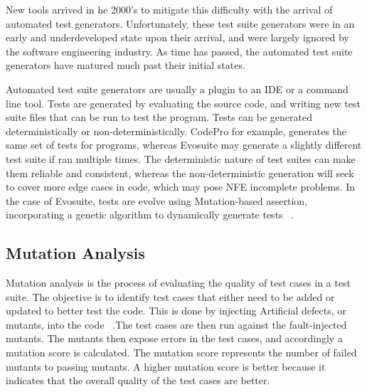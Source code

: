 \documentclass[conference]{IEEEtran}
\begin{document}
New tools arrived in he 2000's to mitigate this difficulty with the arrival of automated test generators. Unfortunately, these test suite generators were in an early and underdeveloped state upon their arrival, and were largely ignored by the software engineering industry. As time has passed, the automated test suite generators have matured much past their initial states.

Automated test suite generators are usually a plugin to an IDE or a command line tool. Tests are generated by evaluating the source code, and writing new test suite files that can be run to test the program.  Tests can be generated deterministically or non-deterministically. CodePro for example, generates the same set of tests for programs, whereas Evosuite may generate a slightly different test suite if ran multiple times. The deterministic nature of test suites can make them reliable and consistent, whereas the non-deterministic generation will seek to cover more edge cases in code, which may pose NFE incomplete problems. In the case of Evosuite, tests are evolve using Mutation-based assertion, incorporating a genetic algorithm to dynamically generate tests ~\cite{Fraser:2011:EAT:2025113.2025179}. 

\subsection{Mutation Analysis}
Mutation analysis is the process of evaluating the quality of test cases in a test suite. The objective is to identify test cases that either need to be added or updated to better test the code. This is done by injecting Artificial defects, or mutants, into the code ~\cite{Fraser:2010:MGU:1831708.1831728}.The test cases are then run against the fault-injected mutants. The mutants then expose errors in the test cases, and accordingly a mutation score is calculated. The mutation score represents the number of failed mutants to passing mutants. A higher mutation score is better because it indicates that the overall quality of the test cases are better. 
\end{document}
